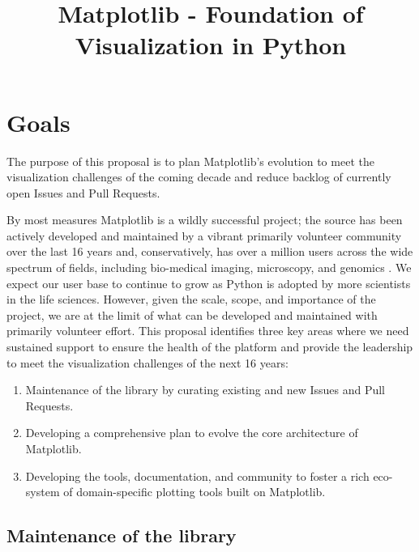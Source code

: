 \documentclass[11pt]{article}  %
\begin{document}
\title{Matplotlib - Foundation of Visualization in Python}
\author{}
\maketitle

\section{Goals}

The purpose of this proposal is to plan Matplotlib's evolution to meet
the visualization challenges of the coming decade and reduce backlog
of currently open Issues and Pull Requests.

By most measures Matplotlib is a wildly successful project; the source
has been actively developed and maintained by a vibrant primarily
volunteer community over the last 16 years and, conservatively, has
over a million users across the wide spectrum of fields, including
bio-medical imaging, microscopy, and genomics
\cite{Carpenter2006,Wolf2018,10.7717/peerj.453}
\cite{Segata2011,10.1371/journal.pgen.1000695,HASHIMSHONY2012666,
  10.1093/bioinformatics/bts480,Carlile2014,Laganowsky2014,Jiangaac9462,
  10.3389/fninf.2014.00014}.  We expect our user base to continue to
grow as Python is adopted by more scientists in the life sciences.
However, given the scale, scope, and importance of the project, we are
at the limit of what can be developed and maintained with primarily
volunteer effort.  This proposal identifies three key areas where we
need sustained support to ensure the health of the platform and
provide the leadership to meet the visualization challenges of the
next 16 years:

\begin{enumerate}[label=\alph*)]
  \item Maintenance of the library by curating existing and new Issues
    and Pull Requests.
  \item Developing a comprehensive plan to evolve the core architecture
    of Matplotlib.
  \item Developing the tools, documentation, and community to foster a
    rich eco-system of domain-specific plotting tools built on
    Matplotlib.
\end{enumerate}


\subsection{Maintenance of the library}
\end{document}

